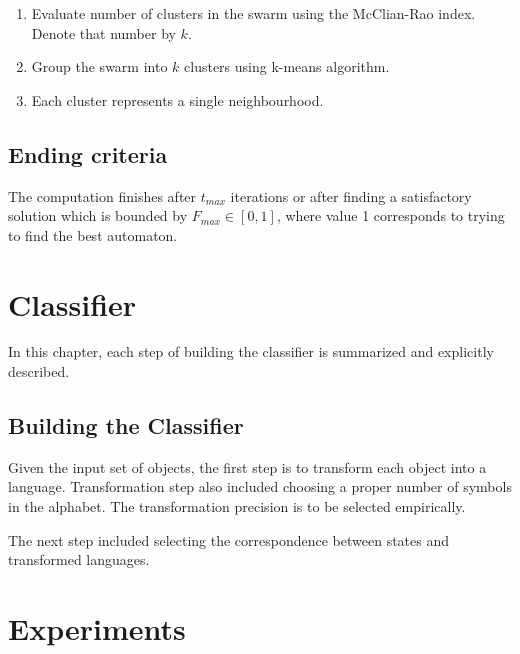 \documentclass{mini}
\begin{document}
\begin{enumerate}
    \item Evaluate number of clusters in the swarm using the McClian-Rao index. Denote that number by $k$.
    \item Group the swarm into $k$ clusters using k-means algorithm.
    \item Each cluster represents a single neighbourhood.
\end{enumerate}


\section{Ending criteria}
The computation finishes after $t_{max}$ iterations or after finding a satisfactory solution which is bounded by $F_{max} \in [0,1]$, where value 1 corresponds to trying to find the best automaton.

\chapter{Classifier}\label{chap:classification}

In this chapter, each step of building the classifier is summarized and explicitly described.

\section{Building the Classifier}\label{sec:classification_transf_step}
Given the input set of objects, the first step is to transform each object into a language. Transformation step also included choosing a proper number of symbols in the alphabet. The transformation precision is to be selected empirically.

The next step included selecting the correspondence between states and transformed languages.


\chapter{Experiments}\label{chap:experiments}
\end{document}
